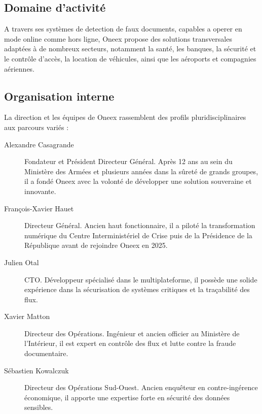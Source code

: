 \subsection{Domaine d'activité}

A travers ses systèmes de detection de faux documents, capables a operer en mode online comme hors ligne, Oneex propose des solutions transversales adaptées à de nombreux secteurs, notamment la santé, les banques, la sécurité et le contrôle d’accès, la location de véhicules, ainsi que les aéroports et compagnies aériennes.

\subsection{Organisation interne}

La direction et les équipes de Oneex rassemblent des profils pluridisciplinaires aux parcours variés :

\begin{description}
	\item[Alexandre Casagrande] Fondateur et Président Directeur Général. Après 12 ans au sein du Ministère des Armées et plusieurs années dans la sûreté de grands groupes, il a fondé Oneex avec la volonté de développer une solution souveraine et innovante.

	\item[François-Xavier Hauet] Directeur Général. Ancien haut fonctionnaire, il a piloté la transformation numérique du Centre Interministériel de Crise puis de la Présidence de la République avant de rejoindre Oneex en 2025.

	\item[Julien Otal] CTO. Développeur spécialisé dans le multiplateforme, il possède une solide expérience dans la sécurisation de systèmes critiques et la traçabilité des flux.

	\item[Xavier Matton] Directeur des Opérations. Ingénieur et ancien officier au Ministère de l’Intérieur, il est expert en contrôle des flux et lutte contre la fraude documentaire.


	\item[Sébastien Kowalczuk] Directeur des Opérations Sud-Ouest. Ancien enquêteur en contre-ingérence économique, il apporte une expertise forte en sécurité des données sensibles.
\end{description}

